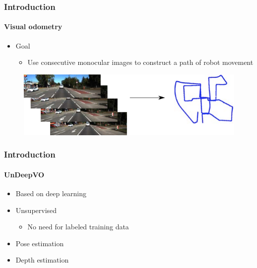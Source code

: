 \begin{frame}
    \frametitle{Introduction}
    \framesubtitle{Visual odometry}
    \begin{itemize}
        \item Goal
        \begin{itemize}
            \item Use consecutive monocular images to construct a path of robot movement
        \end{itemize}
    \end{itemize}
    \begin{figure}
        \includegraphics[scale=0.8]{images/vo-objective.png}
    \end{figure}
\end{frame}

\begin{frame}
    \frametitle{Introduction}
    \framesubtitle{UnDeepVO}
    \begin{itemize}
        \item Based on deep learning
        \item Unsupervised
        \begin{itemize}
            \item No need for labeled training data
        \end{itemize}
        \item Pose estimation
        \item Depth estimation
    \end{itemize}
\end{frame}
